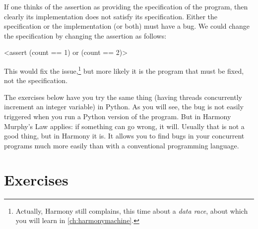 \documentclass{report}
\newenvironment{code}{
\tcolorbox
}{
\endtcolorbox
}
\begin{document}
%

If one thinks of the assertion as providing the specification of the
program, then clearly its implementation does not satisfy its specification.
Either the specification or the implementation (or both) must have a bug.
We could change the specification by changing the assertion as follows:

\begin{code}
<{assert (count == 1) or (count == 2)}>
\end{code}

This would fix the issue,\footnote{Actually, Harmony still complains, this time
about a \emph{data race}, about which you will learn in \autoref{ch:harmonymachine}.}
but more likely it is the program that must be fixed, not the specification.

The exercises below have you try the same thing (having threads
concurrently increment an integer variable) in Python.  As you will
see, the bug is not easily triggered when you run a Python version of
the program.  But in Harmony Murphy's Law applies:
if something can go wrong, it will.  Usually that is not a good thing,
but in Harmony it is.  It allows you to find bugs in your concurrent
programs much more easily than with a conventional programming language.

\section*{Exercises}

\end{document}
